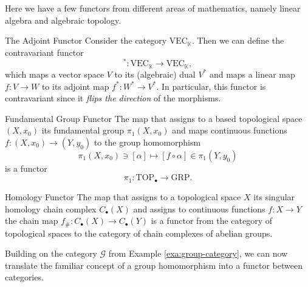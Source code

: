 Here we have a few functors from different areas of mathematics, namely linear algebra and algebraic topology.

\begin{example}{The Adjoint Functor \cite[Ex.~1.2.12]{Leinster2014-dc}}{}
Consider the category $\mathrm{VEC}_\mathbb{K}$. Then we can define the contravariant functor
$$
^* \colon \mathrm{VEC}_\mathbb{K} \to \mathrm{VEC}_\mathbb{K},
$$
which maps a vector space $V$ to its (algebraic) dual $V^*$ and maps a linear map $f\colon V \to W$ to its adjoint map $f^*\colon W^* \to V^*$. In particular, this functor is contravariant since it \emph{flips the direction} of the morphisms.
\end{example}

\begin{example}{Fundamental Group Functor \cite[Ex.~1.2.5]{Leinster2014-dc}}{}
The map that assigns to a based topological space $(X,x_0)$ its fundamental group $\pi_1(X,x_0)$ and maps continuous functions $f\colon (X,x_0) \to (Y,y_0)$ to the group homomorphism 
$$
\pi_1(X,x_0) \ni [\alpha] \mapsto [f \circ \alpha] \in \pi_1(Y,y_0)
$$
is a functor
$$
\pi_1\colon \mathrm{TOP}_\bullet \to \mathrm{GRP}.
$$
\end{example}

\begin{example}{Homology Functor \cite[Chap.~2]{Hatcher2001}}{}
The map that assigns to a topological space $X$ its singular homology chain complex $C_\bullet(X)$ and assigns to continuous functions $f\colon X \to Y$ the chain map ${f_\#\colon C_\bullet(X) \to C_\bullet(Y)}$ is a functor from the category of topological spaces to the category of chain complexes of abelian groups.
\end{example}

Building on the category $\mathcal{G}$ from Example \ref{exa:group-category}, we can now translate the familiar concept of a group homomorphism into a functor between categories.

